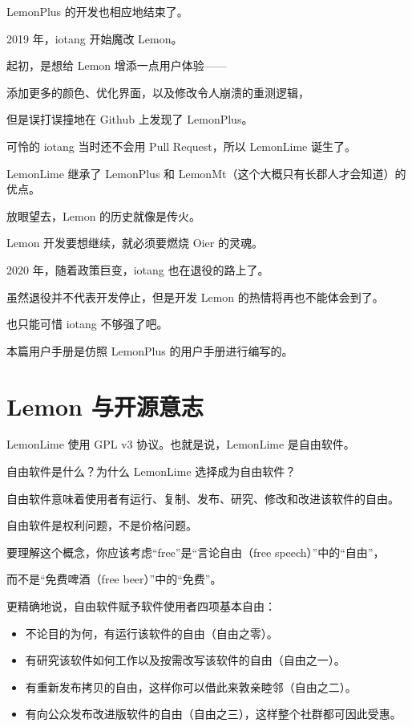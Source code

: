 \documentclass[UTF-8]{ctexart}
\begin{document}
		LemonPlus 的开发也相应地结束了。\newline
		
		2019 年，iotang 开始魔改 Lemon。
		
		起初，是想给 Lemon 增添一点用户体验——
		
		添加更多的颜色、优化界面，以及修改令人崩溃的重测逻辑，
		
		但是误打误撞地在 Github 上发现了 LemonPlus。
		
		可怜的 iotang 当时还不会用 Pull Request，所以 LemonLime 诞生了。
		
		LemonLime 继承了 LemonPlus 和 LemonMt（这个大概只有长郡人才会知道）的优点。\newline
		
		放眼望去，Lemon 的历史就像是传火。
		
		Lemon 开发要想继续，就必须要燃烧 Oier 的灵魂。
		
		2020 年，随着政策巨变，iotang 也在退役的路上了。
		
		虽然退役并不代表开发停止，但是开发 Lemon 的热情将再也不能体会到了。
		
		也只能可惜 iotang 不够强了吧。\newline
		
		本篇用户手册是仿照 LemonPlus 的用户手册进行编写的。
		
	\newpage
	
	\section{Lemon 与开源意志}
		
		LemonLime 使用 GPL v3 协议。也就是说，LemonLime 是自由软件。\newline
		
		自由软件是什么？为什么 LemonLime 选择成为自由软件？
		
		自由软件意味着使用者有运行、复制、发布、研究、修改和改进该软件的自由。
		
		自由软件是权利问题，不是价格问题。
		
		要理解这个概念，你应该考虑“free”是“言论自由（free speech）”中的“自由”，
		
		而不是“免费啤酒（free beer）”中的“免费”。\newline
		
		更精确地说，自由软件赋予软件使用者四项基本自由：
		
		\begin{itemize}
			\item 不论目的为何，有运行该软件的自由（自由之零）。
			\item 有研究该软件如何工作以及按需改写该软件的自由（自由之一）。
			\item 有重新发布拷贝的自由，这样你可以借此来敦亲睦邻（自由之二）。
			\item 有向公众发布改进版软件的自由（自由之三），这样整个社群都可因此受惠。
		\end{itemize}
	
\end{document}
